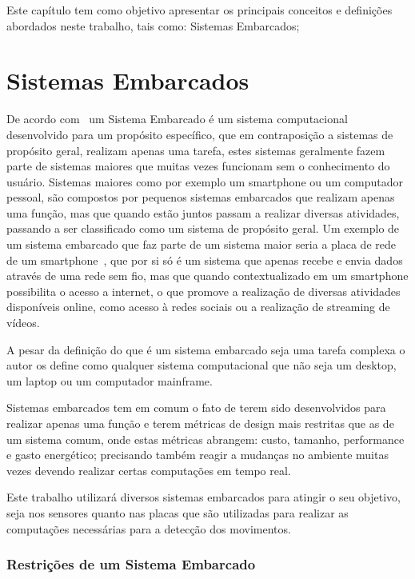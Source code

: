 \label{chapter:conceitos}
Este capítulo tem como objetivo apresentar os principais conceitos e definições abordados neste trabalho, tais como:
Sistemas Embarcados;


\section{Sistemas Embarcados}
De acordo com~\cite{VAHID:2001} um Sistema Embarcado é um sistema computacional desenvolvido para um propósito específico, que em contraposição a sistemas de propósito geral, realizam apenas uma tarefa, estes sistemas geralmente fazem parte de sistemas maiores que muitas vezes funcionam sem o conhecimento do usuário. Sistemas maiores como por exemplo um smartphone ou um computador pessoal, são compostos por pequenos sistemas embarcados que realizam apenas uma função, mas que quando estão juntos passam a realizar diversas atividades, passando a ser classificado como um sistema de propósito geral. Um exemplo de um sistema embarcado que faz parte de um sistema maior seria a placa de rede de um smartphone~\cite{qualcomm_2017}, que por si só é um sistema que apenas recebe e envia dados através de uma rede sem fio, mas que quando contextualizado em um smartphone possibilita o acesso a internet, o que promove a realização de diversas atividades disponíveis online, como acesso à redes sociais ou a realização de streaming de vídeos.

A pesar da definição do que é um sistema embarcado seja uma tarefa complexa o autor os define como qualquer sistema computacional que não seja um desktop, um laptop ou um computador mainframe.


Sistemas embarcados tem em comum o fato de terem sido desenvolvidos para realizar apenas uma função e terem métricas de design mais restritas que as de um sistema comum, onde estas métricas abrangem: custo, tamanho, performance e gasto energético; precisando também reagir a mudanças no ambiente muitas vezes devendo realizar certas computações em tempo real.


Este trabalho utilizará diversos sistemas embarcados para atingir o seu objetivo, seja nos sensores quanto nas placas que são utilizadas para realizar as computações necessárias para a detecção dos  movimentos.

\subsubsection{Restrições de um Sistema Embarcado}


